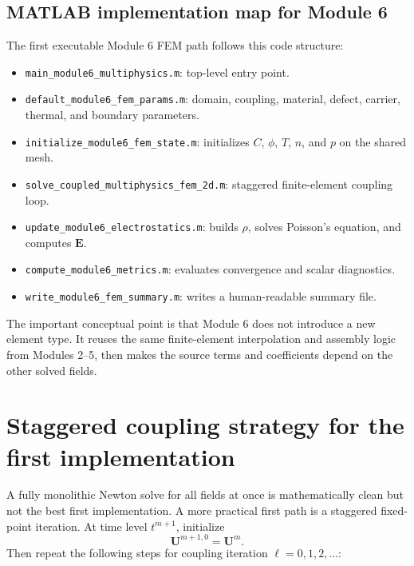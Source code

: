 \documentclass[11pt]{article}
\newcommand{\Evec}{\bm{E}}
\newcommand{\Uvec}{\bm{U}}
\begin{document}
\subsection{MATLAB implementation map for Module 6}

The first executable Module 6 FEM path follows this code structure:
\begin{itemize}[leftmargin=2em]
\item \texttt{main\_module6\_multiphysics.m}: top-level entry point.
\item \texttt{default\_module6\_fem\_params.m}: domain, coupling, material, defect, carrier, thermal, and boundary parameters.
\item \texttt{initialize\_module6\_fem\_state.m}: initializes \(C\), \(\phi\), \(T\), \(n\), and \(p\) on the shared mesh.
\item \texttt{solve\_coupled\_multiphysics\_fem\_2d.m}: staggered finite-element coupling loop.
\item \texttt{update\_module6\_electrostatics.m}: builds \(\rho\), solves Poisson's equation, and computes \(\Evec\).
\item \texttt{compute\_module6\_metrics.m}: evaluates convergence and scalar diagnostics.
\item \texttt{write\_module6\_fem\_summary.m}: writes a human-readable summary file.
\end{itemize}

The important conceptual point is that Module 6 does not introduce a new element type. It reuses the same finite-element interpolation and assembly logic from Modules 2--5, then makes the source terms and coefficients depend on the other solved fields.

\section{Staggered coupling strategy for the first implementation}

A fully monolithic Newton solve for all fields at once is mathematically clean but not the best first implementation. A more practical first path is a staggered fixed-point iteration. At time level \(t^{m+1}\), initialize
\begin{equation}
\Uvec^{m+1,0}=\Uvec^m.
\end{equation}
Then repeat the following steps for coupling iteration \(\ell=0,1,2,\ldots\):
\end{document}
